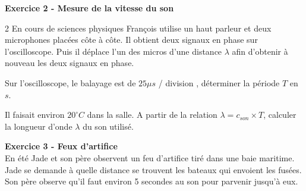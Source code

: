 \documentclass[11pt,a4paper]{article}
\newcommand{\cadreblanc}[1]{%
\medskip\framebox[\linewidth][c]{%
\rule{0mm}{#1mm}}\par
\medskip}
\begin{document}
\textbf{Exercice 2 - Mesure de la vitesse du son}
\begin{multicols}{2}
En cours de sciences physiques François utilise un haut parleur et deux microphones placées côte à côte. Il obtient deux signaux en phase sur l'oscilloscope. Puis il déplace l'un des micros d'une distance $\lambda$ afin d'obtenir à nouveau les deux signaux en phase. 
\begin{center}
    
\def\scl{0.5}%
\end{center} 
\end{multicols}

 Sur l'oscilloscope, le balayage est de $25 \mu s$ / division , déterminer la période $T$ en $s$.\\
\cadreblanc{15}

 Il faisait environ $20 ^\circ C$ dans la salle. A partir de la relation $\lambda = c_{son} \times T$, calculer la longueur d'onde $\lambda$ du son utilisé.\\
\cadreblanc{15} 


\textbf{Exercice 3 - Feux d'artifice}\\
En été Jade et son père observent un feu d'artifice tiré dans une baie maritime. Jade se demande à quelle distance se trouvent les bateaux qui envoient les fusées. Son père observe qu'il faut  environ 5 secondes au son pour parvenir jusqu'à eux.\\ 
\end{document}
